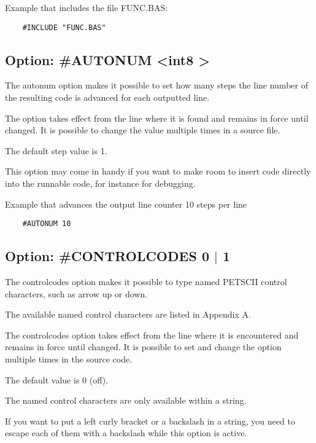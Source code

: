 \documentclass{article}
\begin{document}
        Example that includes the file FUNC.BAS:
        \begin{verbatim}
    #INCLUDE "FUNC.BAS"
        \end{verbatim}    

    \subsection{Option: \#AUTONUM \textless int8 \textgreater }

        The autonum option makes it possible to set how many
        steps the line number of the resulting code is
        advanced for each outputted line.

        The option takes effect from the line where it is
        found and remains in force until changed. It is
        possible to change the value multiple times in a
        source file.

        The default step value is 1.

        This option may come in handy if you want to make
        room to insert code directly into the runnable code,
        for instance for debugging.
        
        Example that advances the output line counter 10 steps per line
        \begin{verbatim}
    #AUTONUM 10
        \end{verbatim}

    \subsection{Option: \#CONTROLCODES 0 $|$ 1}
        The controlcodes option makes it possible to type
        named PETSCII control characters, such as arrow up or
        down.

        The available named control characters are listed in
        Appendix A.

        The controlcodes option takes effect from the line
        where it is encountered and remains in force until
        changed. It is possible to set and change the
        option multiple times in the source code.

        The default value is 0 (off).

        The named control characters are only available
        within a string.

        If you want to put a left curly bracket or a 
        backslash in a string, you need to escape each of them with 
        a backslash while this option is active.
\end{document}
